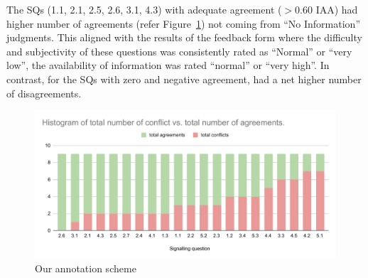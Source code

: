 \documentclass[sn-mathphys,Numbered]{sn-jnl}%
\theoremstyle{thmstyleone}%
\theoremstyle{thmstyletwo}%
\theoremstyle{thmstylethree}%
\begin{document}
The SQs (1.1, 2.1, 2.5, 2.6, 3.1, 4.3) with adequate agreement ($>0.60$ IAA) had higher number of agreements (refer Figure~\ref{fig:pabakagreement}) not coming from ``No Information'' judgments.
This aligned with the results of the feedback form where the difficulty and subjectivity of these questions was consistently rated as ``Normal'' or ``very low'', the availability of information was rated ``normal'' or ``very high''.
In contrast, for the SQs with zero and negative agreement, had a net higher number of disagreements.


%
%
%
\begin{figure}
    \centering
    \includegraphics[width=0.99\columnwidth]{figures/agreements.pdf}
    \caption{Our annotation scheme}
    \label{fig:pabakagreement}
\end{figure}
%
%
%
\end{document}
